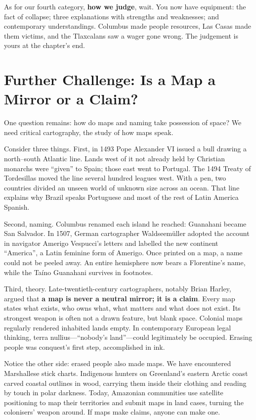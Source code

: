 As for our fourth category, \textbf{how we judge}, wait. You now have equipment: the fact of collapse; three explanations with strengths and weaknesses; and contemporary understandings. Columbus made people resources, Las Casas made them victims, and the Tlaxcalans saw a wager gone wrong. The judgement is yours at the chapter's end.

\section[Further Challenge: Maps as Claims]{Further Challenge: Is a Map a Mirror or a Claim?}
One question remains: how do maps and naming take possession of space? We need critical cartography, the study of how maps speak.

Consider three things. First, in 1493 Pope Alexander VI issued a bull drawing a north--south Atlantic line. Lands west of it not already held by Christian monarchs were ``given'' to Spain; those east went to Portugal. The 1494 Treaty of Tordesillas moved the line several hundred leagues west. With a pen, two countries divided an unseen world of unknown size across an ocean. That line explains why Brazil speaks Portuguese and most of the rest of Latin America Spanish.

Second, naming. Columbus renamed each island he reached: Guanahani became San Salvador. In 1507, German cartographer Waldseemüller adopted the account in navigator Amerigo Vespucci's letters and labelled the new continent ``America'', a Latin feminine form of Amerigo. Once printed on a map, a name could not be peeled away. An entire hemisphere now bears a Florentine's name, while the Taíno Guanahani survives in footnotes.

Third, theory. Late-twentieth-century cartographers, notably Brian Harley, argued that \textbf{a map is never a neutral mirror; it is a claim}. Every map states what exists, who owns what, what matters and what does not exist. Its strongest weapon is often not a drawn feature, but blank space. Colonial maps regularly rendered inhabited lands empty. In contemporary European legal thinking, terra nullius---``nobody's land''---could legitimately be occupied. Erasing people was conquest's first step, accomplished in ink.

Notice the other side: erased people also made maps. We have encountered Marshallese stick charts. Indigenous hunters on Greenland's eastern Arctic coast carved coastal outlines in wood, carrying them inside their clothing and reading by touch in polar darkness. Today, Amazonian communities use satellite positioning to map their territories and submit maps in land cases, turning the colonisers' weapon around. If maps make claims, anyone can make one.

